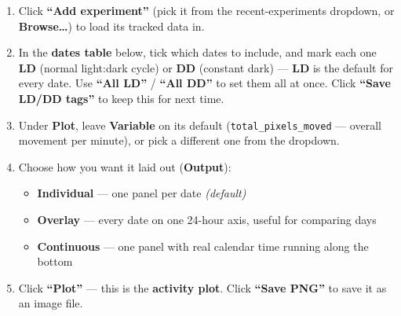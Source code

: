 \documentclass[11pt,a4paper]{article}
\begin{document}
\begin{enumerate}[leftmargin=*]
  \item Click \textbf{``Add experiment''} (pick it from the recent-experiments dropdown, or
        \textbf{Browse\ldots}) to load its tracked data in.

  \item In the \textbf{dates table} below, tick which dates to include, and mark each one
        \textbf{LD} (normal light:dark cycle) or \textbf{DD} (constant dark) --- \textbf{LD} is
        the default for every date. Use \textbf{``All LD''} / \textbf{``All DD''} to set them all
        at once. Click \textbf{``Save LD/DD tags''} to keep this for next time.

  \item Under \textbf{Plot}, leave \textbf{Variable} on its default
        (\texttt{total\_pixels\_moved} --- overall movement per minute), or pick a different one
        from the dropdown.

  \item Choose how you want it laid out (\textbf{Output}):
  \begin{itemize}
    \item \textbf{Individual} --- one panel per date \emph{(default)}
    \item \textbf{Overlay} --- every date on one 24-hour axis, useful for comparing days
    \item \textbf{Continuous} --- one panel with real calendar time running along the bottom
  \end{itemize}

  \item Click \textbf{``Plot''} --- this is the \textbf{activity plot}. Click \textbf{``Save
        PNG''} to save it as an image file.
\end{enumerate}
\end{document}
